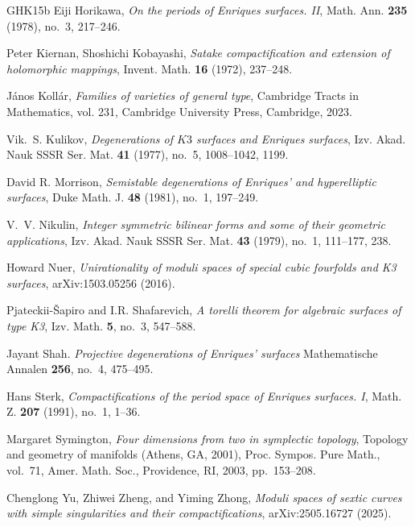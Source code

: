 \documentclass{amsart}
\begin{document}
\begin{thebibliography}{GHK15b}
Eiji Horikawa,
\emph{On the periods of Enriques surfaces. II},
Math. Ann. \textbf{235} (1978), no.~3, 217--246.

Peter Kiernan, Shoshichi Kobayashi,
\emph{Satake compactification and extension of holomorphic mappings},
Invent. Math. \textbf{16} (1972), 237--248.

J\'{a}nos Koll\'{a}r, \emph{Families of varieties of general type}, Cambridge
  Tracts in Mathematics, vol. 231, Cambridge University Press, Cambridge, 2023.

Vik.~S. Kulikov, \emph{Degenerations of {$K3$} surfaces and {E}nriques
  surfaces}, Izv. Akad. Nauk SSSR Ser. Mat. \textbf{41} (1977), no.~5,
  1008--1042, 1199. 

David R. Morrison,
\emph{Semistable degenerations of Enriques’ and hyperelliptic surfaces},
Duke Math. J. \textbf{48} (1981), no.~1, 197--249.

V.~V. Nikulin, \emph{Integer symmetric bilinear forms and some of their
  geometric applications}, Izv. Akad. Nauk SSSR Ser. Mat. \textbf{43} (1979),
  no.~1, 111--177, 238. 

Howard Nuer,
\emph{Unirationality of moduli spaces of special cubic fourfolds and K3 surfaces},
arXiv:1503.05256 (2016).

Pjateckii-Šapiro and I.R. Shafarevich,
\emph{A torelli theorem for algebraic surfaces of type K3},
Izv. Math. \textbf{5}, no.~3, 547--588.

Jayant Shah.
\emph{Projective degenerations of Enriques' surfaces}
Mathematische Annalen \textbf{256}, no.~4, 475--495.

Hans Sterk, \emph{Compactifications of the period space of {E}nriques surfaces.
  {I}}, Math. Z. \textbf{207} (1991), no.~1, 1--36. 

Margaret Symington, \emph{Four dimensions from two in symplectic topology},
  Topology and geometry of manifolds ({A}thens, {GA}, 2001), Proc. Sympos. Pure
  Math., vol.~71, Amer. Math. Soc., Providence, RI, 2003, pp.~153--208.

Chenglong Yu, Zhiwei Zheng, and Yiming Zhong,
\emph{Moduli spaces of sextic curves with simple singularities and their compactifications},
arXiv:2505.16727 (2025).

\end{thebibliography}
\end{document}
